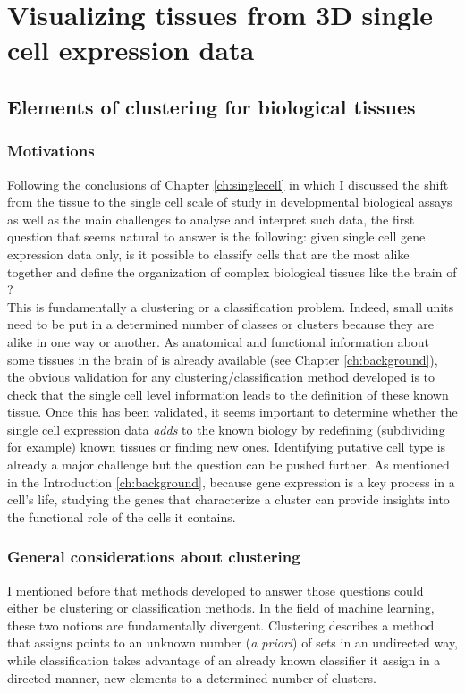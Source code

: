 \chapter{Visualizing tissues from 3D single cell expression data}\label{ch:non_spatial_clustering_visualization} 
\section{Elements of clustering for biological tissues}
	\subsection{Motivations}
	Following the conclusions of Chapter \ref{ch:singlecell} in which I discussed the shift from the tissue to the single cell scale of study in developmental biological assays as well as the main challenges to analyse and interpret such data, the first question that seems natural to answer is the following: given single cell gene expression data only, is it possible to classify cells that are the most alike together and define the organization of complex biological tissues like the brain of \platyfull{}?\\
	
	This is fundamentally a clustering or a classification problem. Indeed, small units need to be put in a determined number of classes or clusters because they are alike in one way or another. As anatomical and functional information about some tissues in the brain of \platy{} is already available (see Chapter \ref{ch:background}), the obvious validation for any clustering/classification method developed is to check that the single cell level information leads to the definition of these known tissue. Once this has been validated, it seems important to determine whether the single cell expression data \emph{adds} to the known biology by redefining (subdividing for example) known tissues or finding new ones. Identifying putative cell type is already a major challenge but the question can be pushed further. As mentioned in the Introduction \ref{ch:background}, because gene expression is a key process in a cell's life, studying the genes that characterize a cluster can provide insights into the functional role of the cells it contains.

	\subsection{General considerations about clustering}
	I mentioned before that methods developed to answer those questions could either be clustering or classification methods. In the field of machine learning, these two notions are fundamentally divergent. Clustering describes a method that assigns points to an unknown number (\emph{a priori}) of sets in an undirected way, while classification takes advantage of an already known classifier it assign in a directed manner, new elements to a determined number of clusters.\\
	
